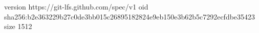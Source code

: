 version https://git-lfs.github.com/spec/v1
oid sha256:b2e363229b27c0de3bb015c26895182824e9eb150e3b62b5c7292ecfdbe35423
size 1512
